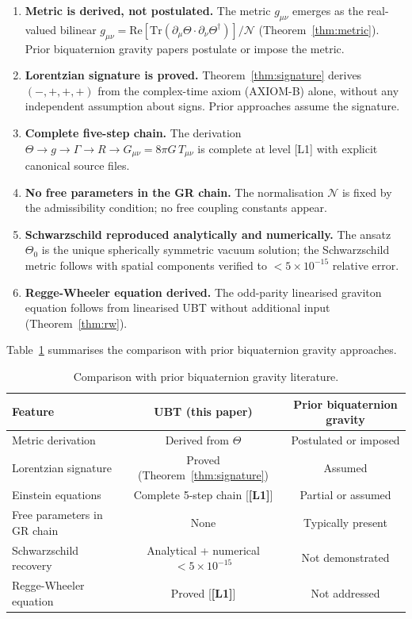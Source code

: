 \documentclass[12pt,a4paper]{article}
\theoremstyle{definition}
\theoremstyle{remark}
\newcommand{\Lone}{\textbf{[L1]}}
\newcommand{\Tr}{\mathrm{Tr}}
\newcommand{\re}{\mathrm{Re}}
\newcommand{\calN}{\mathcal{N}}
\begin{document}
\begin{enumerate}
  \item \textbf{Metric is derived, not postulated.}
        The metric $g_{\mu\nu}$ emerges as the real-valued bilinear
        $g_{\mu\nu} = \re[\Tr(\partial_\mu\Theta \cdot \partial_\nu\Theta^\dagger)]/\calN$
        (Theorem~\ref{thm:metric}).
        Prior biquaternion gravity papers postulate or impose the metric.

  \item \textbf{Lorentzian signature is proved.}
        Theorem~\ref{thm:signature} derives $(-,+,+,+)$ from the complex-time
        axiom (AXIOM-B) alone, without any independent assumption about signs.
        Prior approaches assume the signature.

  \item \textbf{Complete five-step chain.}
        The derivation $\Theta \to g \to \Gamma \to R \to G_{\mu\nu} = 8\pi G\,T_{\mu\nu}$
        is complete at level [L1] with explicit canonical source files.

  \item \textbf{No free parameters in the GR chain.}
        The normalisation $\calN$ is fixed by the admissibility condition;
        no free coupling constants appear.

  \item \textbf{Schwarzschild reproduced analytically and numerically.}
        The ansatz $\Theta_0$ is the unique spherically symmetric vacuum solution;
        the Schwarzschild metric follows with spatial components verified to
        $< 5\times 10^{-15}$ relative error.

  \item \textbf{Regge-Wheeler equation derived.}
        The odd-parity linearised graviton equation follows from linearised
        UBT without additional input (Theorem~\ref{thm:rw}).
\end{enumerate}

Table~\ref{tab:novelty} summarises the comparison with prior biquaternion
gravity approaches.

\begin{table}[ht]
\centering
\caption{Comparison with prior biquaternion gravity literature.}
\label{tab:novelty}
\begin{tabular}{lcc}
\toprule
\textbf{Feature} & \textbf{UBT (this paper)} & \textbf{Prior biquaternion gravity} \\
\midrule
Metric derivation & Derived from $\Theta$ & Postulated or imposed \\
Lorentzian signature & Proved (Theorem~\ref{thm:signature}) & Assumed \\
Einstein equations & Complete 5-step chain [\Lone] & Partial or assumed \\
Free parameters in GR chain & None & Typically present \\
Schwarzschild recovery & Analytical + numerical $<5\times 10^{-15}$ & Not demonstrated \\
Regge-Wheeler equation & Proved [\Lone] & Not addressed \\
\bottomrule
\end{tabular}
\end{table}
\end{document}
